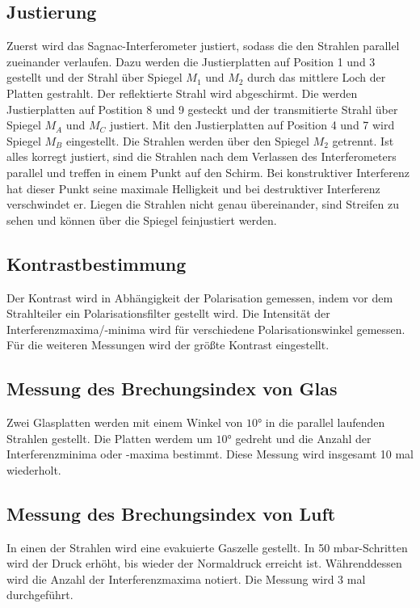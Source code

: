 \subsection{Justierung}%
Zuerst wird das Sagnac-Interferometer justiert,
sodass die den Strahlen parallel zueinander verlaufen.
Dazu werden die Justierplatten auf Position 1 und 3 gestellt 
und der Strahl über Spiegel $M_1$ und $M_2$ durch das mittlere Loch der Platten gestrahlt.
Der reflektierte Strahl wird abgeschirmt.
Die werden Justierplatten auf Postition 8 und 9 gesteckt und
der transmitierte Strahl über Spiegel $M_A$ und $M_C$  justiert.
Mit den Justierplatten auf Position 4 und 7 wird Spiegel $M_B$ eingestellt.
Die Strahlen werden über den Spiegel $M_2$ getrennt.
\noindent Ist alles korregt justiert,
sind die Strahlen nach dem Verlassen des Interferometers parallel und
treffen in einem Punkt auf den Schirm.
Bei konstruktiver Interferenz hat dieser Punkt seine maximale Helligkeit 
und bei destruktiver Interferenz verschwindet er.
Liegen die Strahlen nicht genau übereinander, sind Streifen zu sehen
und können über die Spiegel feinjustiert werden.

\subsection{Kontrastbestimmung}%
Der Kontrast wird in Abhängigkeit der Polarisation gemessen,
indem vor dem Strahlteiler ein Polarisationsfilter gestellt wird.
Die Intensität der Interferenzmaxima/-minima wird für verschiedene Polarisationswinkel gemessen.
\newline \newline
\noindent Für die weiteren Messungen wird der größte Kontrast eingestellt.

\subsection{Messung des Brechungsindex von Glas}%
Zwei Glasplatten werden mit einem Winkel von $10°$ 
in die parallel laufenden Strahlen gestellt.
Die Platten werdem um $10°$ gedreht und die Anzahl der Interferenzminima  oder -maxima bestimmt.
Diese Messung wird insgesamt 10 mal wiederholt.

\subsection{Messung des Brechungsindex von Luft}%
In einen der Strahlen wird eine evakuierte Gaszelle gestellt.
In 50 mbar-Schritten wird der Druck erhöht, bis wieder der Normaldruck erreicht ist.
Währenddessen wird die Anzahl der Interferenzmaxima notiert.
Die Messung wird 3 mal durchgeführt.
